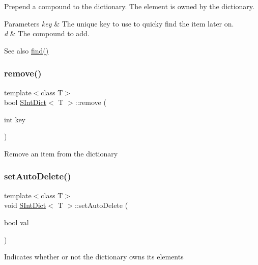 Prepend a compound to the dictionary. The element is owned by the dictionary. 
\begin{DoxyParams}{Parameters}
{\em key} & The unique key to use to quicky find the item later on. \\
\hline
{\em d} & The compound to add. \\
\hline
\end{DoxyParams}
\begin{DoxySeeAlso}{See also}
\mbox{\hyperlink{class_s_int_dict_a5b08deebe24072f66bdce4fed2a3863d}{find()}} 
\end{DoxySeeAlso}
\mbox{\label{class_s_int_dict_a3e7bf8861e4650f5f958000b86b2312a}} 
\subsubsection{\texorpdfstring{remove()}{remove()}}
{\footnotesize\ttfamily template$<$class T$>$ \\
bool \mbox{\hyperlink{class_s_int_dict}{S\+Int\+Dict}}$<$ T $>$\+::remove (\begin{DoxyParamCaption}\item[{int}]{key }\end{DoxyParamCaption})\hspace{0.3cm}{\ttfamily [inline]}}

Remove an item from the dictionary \mbox{\label{class_s_int_dict_aa847c843b8f2509d2021d8db470aa14f}} 
\subsubsection{\texorpdfstring{setAutoDelete()}{setAutoDelete()}}
{\footnotesize\ttfamily template$<$class T$>$ \\
void \mbox{\hyperlink{class_s_int_dict}{S\+Int\+Dict}}$<$ T $>$\+::set\+Auto\+Delete (\begin{DoxyParamCaption}\item[{bool}]{val }\end{DoxyParamCaption})\hspace{0.3cm}{\ttfamily [inline]}}

Indicates whether or not the dictionary owns its elements \mbox{\label{class_s_int_dict_ae205d1b7f76cea9da3f117e830bd7dfa}} 
